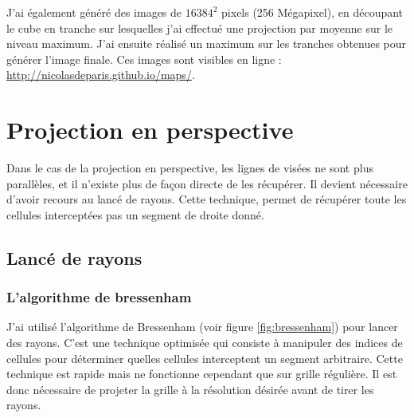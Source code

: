 J'ai également généré des images de $16384^2$ pixels (256 Mégapixel), en découpant le cube en tranche sur lesquelles j'ai effectué une projection par moyenne sur le niveau maximum.
J'ai ensuite réalisé un maximum sur les tranches obtenues pour générer l'image finale.
Ces images sont visibles en ligne : \href{http://nicolasdeparis.github.io/maps/}{http://nicolasdeparis.github.io/maps/}.





\section{Projection en perspective}

Dans le cas de la projection en perspective, les lignes de visées ne sont plus parallèles, et il n'existe plus de façon directe de les récupérer.
Il devient nécessaire d'avoir recours au lancé de rayons.
Cette technique, permet de récupérer toute les cellules interceptées pas un segment de droite donné.

\subsection{Lancé de rayons}
\subsubsection{L'algorithme de bressenham}
J'ai utilisé l'algorithme de Bressenham (voir figure \ref{fig:bressenham}) pour lancer des rayons.
C'est une technique optimisée qui consiste à manipuler des indices de cellules pour déterminer quelles cellules interceptent un segment arbitraire.
Cette technique est rapide mais ne fonctionne cependant que sur grille régulière.
Il est donc nécessaire de projeter la grille à la résolution désirée avant de tirer les rayons.

